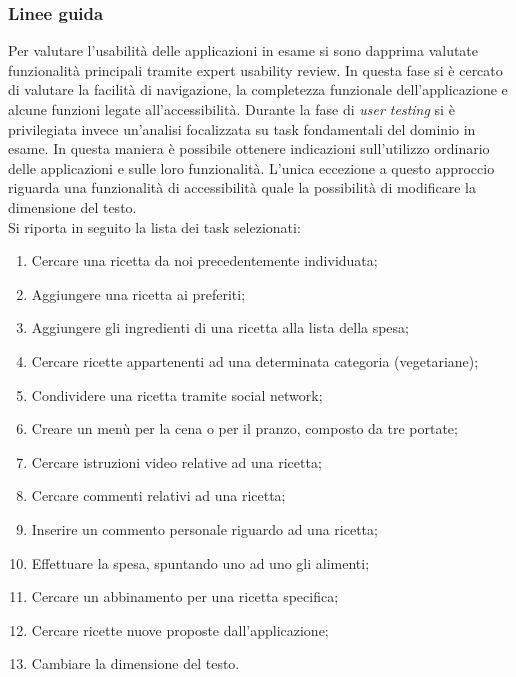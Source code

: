 \subsubsection{Linee guida}
Per valutare l'usabilità delle applicazioni in esame si sono dapprima valutate
funzionalità principali tramite expert usability review.  In questa fase si è
cercato di valutare la facilità di navigazione, la completezza funzionale
dell'applicazione e alcune funzioni legate all'accessibilità.  Durante la fase
di \emph{user testing} si è privilegiata invece un'analisi focalizzata su task
fondamentali del dominio in esame.  In questa maniera è possibile ottenere
indicazioni sull'utilizzo ordinario delle applicazioni e sulle loro
funzionalità.  L'unica eccezione a questo approccio riguarda una funzionalità di
accessibilità quale la possibilità di modificare la dimensione del testo.\\
Si riporta in seguito la lista dei task selezionati:
\begin{enumerate}
	\item Cercare una ricetta da noi precedentemente individuata;
	\item Aggiungere una ricetta ai preferiti;
	\item Aggiungere gli ingredienti di una ricetta alla lista della spesa;
	\item Cercare ricette appartenenti ad una determinata categoria
		(vegetariane);
	\item Condividere una ricetta tramite social network;
	\item Creare un menù per la cena o per il pranzo, composto da tre portate;
	\item Cercare istruzioni video relative ad una ricetta;
	\item Cercare commenti relativi ad una ricetta;
	\item Inserire un commento personale riguardo ad una ricetta;
	\item Effettuare la spesa, spuntando uno ad uno gli alimenti;
	\item Cercare un abbinamento per una ricetta specifica;
	\item Cercare ricette nuove proposte dall'applicazione;
	\item Cambiare la dimensione del testo.
\end{enumerate}

